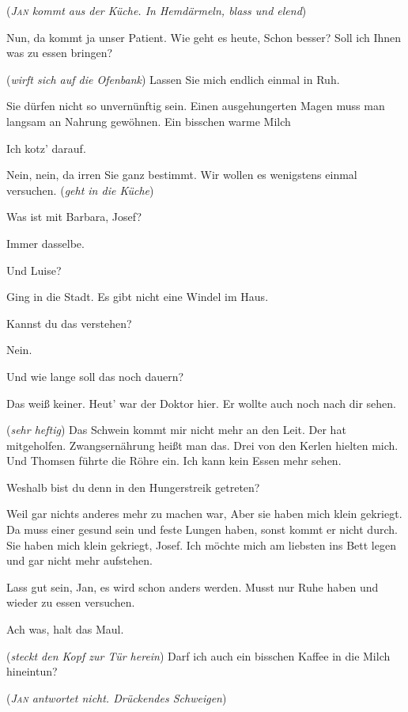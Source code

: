 \documentclass[
	final,
	a4paper,
	ngerman,
	mpinclude = true, %
	twoside = true,
	open = right,
	cleardoublepage = plain,
	DIV = 13,
	BCOR = 1cm,
	titlepage = firstiscover,
	]{scrbook}
\newcommand{\direction}[1]{(\textit{#1})}
\newcommand{\thecharacter}[1]{\textup{\textsc{#1}}\xspace}
\newcommand{\theJosef}{\thecharacter{Josef}}
\newcommand{\theJan}{\thecharacter{Jan}}
\newcommand{\character}[1]{\item[#1]}
\newcommand{\Josef}{\character{\theJosef}}
\newcommand{\Jan}{\character{\theJan}}
\newcommand{\Heilsarmeeschwester}{\character{Schwester}}
\begin{document}
\begin{play}
\direction{\theJan kommt aus der Küche. In Hemdärmeln, blass und elend}

\Heilsarmeeschwester
Nun, da kommt ja unser Patient. Wie geht es heute, Schon besser? Soll ich Ihnen was zu essen bringen?

\Jan
\direction{wirft sich auf die Ofenbank} Lassen Sie mich endlich einmal in Ruh.

\Heilsarmeeschwester
Sie dürfen nicht so unvernünftig sein. Einen ausgehungerten Magen muss man langsam an Nahrung gewöhnen. Ein bisschen warme Milch

\Jan
Ich kotz' darauf.

\Heilsarmeeschwester
Nein, nein, da irren Sie ganz bestimmt. Wir wollen es wenigstens einmal versuchen. \direction{geht in die Küche}

\Jan
Was ist mit Barbara, Josef?

\Josef
Immer dasselbe.

\Jan
Und Luise?

\Josef
Ging in die Stadt. Es gibt nicht eine Windel im Haus.

\Jan
Kannst du das verstehen?

\Josef
Nein.

\Jan
Und wie lange soll das noch dauern?

\Josef
Das weiß keiner. Heut' war der Doktor hier. Er wollte auch noch nach dir sehen.

\Jan
\direction{sehr heftig} Das Schwein kommt mir nicht mehr an den Leit. Der hat mitgeholfen. Zwangsernährung heißt man das. Drei von den Kerlen hielten mich. Und Thomsen führte die Röhre ein. Ich kann kein Essen mehr sehen.

\Josef
Weshalb bist du denn in den Hungerstreik getreten?

\Jan
Weil gar nichts anderes mehr zu machen war, Aber sie haben mich klein gekriegt. Da muss einer gesund sein und feste Lungen haben, sonst kommt er nicht durch. Sie haben mich klein gekriegt, Josef. Ich möchte mich am liebsten ins Bett legen und gar nicht mehr aufstehen.

\Josef
Lass gut sein, Jan, es wird schon anders werden. Musst nur Ruhe haben und wieder zu essen versuchen.

\Jan
Ach was, halt das Maul.

\Heilsarmeeschwester
\direction{steckt den Kopf zur Tür herein} Darf ich auch ein bisschen Kaffee in die Milch hineintun?

\direction{\theJan antwortet nicht. Drückendes Schweigen}


\end{play}
\end{document}
